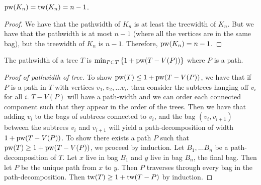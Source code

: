 \begin{example}
	\(\operatorname{pw}(K_n) = \operatorname{tw}(K_n) = n - 1\).
\end{example}
\begin{proof}
	We have that the pathwidth of \(K_n\) is at least the treewidth of \(K_n\). But we have that the pathwidth is at most \(n- 1\) (where all the vertices are in the same bag), but the treewidth of \(K_n\) is \(n - 1\). Therefore, \(\operatorname{pw}(K_n) = n - 1\).
\end{proof}

\begin{theorem}
	The pathwidth of a tree \(T\) is \(\min_{P \subset T} \left\lbrace 1 + \operatorname{pw}(T - V(P))\right\rbrace \) where \(P\) is a path.
\end{theorem}

\begin{proof}[Proof of pathwidth of tree]
	To show \(\operatorname{pw}(T) \leq 1 + \operatorname{pw}(T - V(P))\), we have that if \(P\) is a path in \(T\) with vertices \(v_1, v_2, \ldots v_i\), then consider the subtrees hanging off \(v_i\) for all \(i\). \(T - V(P)\) will have a path-width and we can order each connected component such that they appear in the order of the trees. Then we have that adding \(v_i\) to the bags of subtrees connected to \(v_i\), and the bag \((v_i, v_{i+1})\) between the subtrees \(v_i\) and \(v_{i + 1}\) will yield a path-decomposition of width \(1 + \operatorname{pw}(T - V(P))\).
	To show there exists a path \(P\) such that \(\operatorname{pw}(T) \geq 1 + \operatorname{pw}(T - V(P))\), we proceed by induction. Let \(B_1, \ldots B_n\) be a path-decomposition of \(T\). Let \(x\) live in bag \(B_1\) and \(y\) live in bag \(B_n\), the final bag. Then let \(P\) be the unique path from \(x\) to \(y\). Then \(P\) traverses through every bag in the path-decomposition. Then \(\operatorname{tw}(T) \geq 1 + \operatorname{tw}(T - P)\) by induction.
\end{proof}
